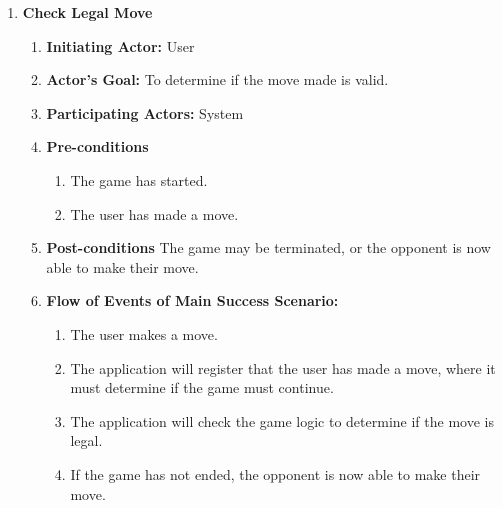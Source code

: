 \documentclass[12pt, titlepage]{article}
\begin{document}
\begin{enumerate}[{UC}1.]
                \item \textbf{Check Legal Move}
                    \begin{enumerate}[{ }]
                        \item \textbf{Initiating Actor:} 
                            User
            
                        \item \textbf{Actor's Goal:} 
                            To determine if the move made is valid.
                        
                        \item \textbf{Participating Actors:} 
                            System
                        
                        \item \textbf{Pre-conditions}
                            \begin{enumerate}
                                \item The game has started.
                                \item The user has made a move.
                            \end{enumerate}
                            
                        \item \textbf{Post-conditions}
                            The game may be terminated, or the opponent is now able to make their move.
                            
                        \item \textbf{Flow of Events of Main Success Scenario:}
                           \begin{enumerate}
                                \item The user makes a move.
                                \item The application will register that the user has made a move, where it must determine if the game must continue.
                                \item The application will check the game logic to determine if the move is legal.
                                \item If the game has not ended, the opponent is now able to make their move.
                            \end{enumerate}
                    \end{enumerate}
                    

\end{enumerate}
\end{document}
